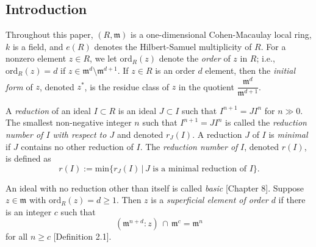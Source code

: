 \documentclass{amsart}
\theoremstyle{definition}
\theoremstyle{definition}
\numberwithin{equation}{section}
\theoremstyle{definition}
\begin{document}
\large{
\begin{center}
\section{Introduction}
\end{center}

Throughout this paper, $(R,\mathfrak{m})$ is a one-dimensional Cohen-Macaulay local ring, $k$ is a field, and $e(R)$ denotes the Hilbert-Samuel multiplicity of $R$. For a nonzero element $z \in R$, we let $\text{ord}_{R}(z)$ denote the {\it{order}} of $z$ in $R$; i.e., $\text{ord}_{R}(z)=d$ if $z \in \mathfrak{m}^d \setminus \mathfrak{m}^{d+1}$. If $z \in R$ is an order $d$ element, then the {\it{initial form}} of $z$, denoted $z^*$, is the residue class of $z$ in the quotient $\dfrac{\mathfrak{m}^d}{\mathfrak{m}^{d+1}}$. 
\\\text{}

A {\it{reduction}} of an ideal $I \subset R$ is an ideal $J \subset I$ such that $I^{n+1}=JI^n$ for $n \gg 0$. The smallest non-negative integer $n$ such that $I^{n+1}=JI^n$ is called the {\it{reduction number of $I$ with respect to $J$}} and denoted $r_{J}(I)$. A reduction $J$ of $I$ is {\it{minimal}} if $J$ contains no other reduction of $I$. The {\it{reduction number of}} $I$, denoted $r(I)$, is defined as \\
\begin{equation*}
r(I):=\text{min}\{r_{J}(I)\,|\,J \,\, \text{is a minimal reduction of} \,\, I\}.
\end{equation*}
\text{}

An ideal with no reduction other than itself is called {\it{basic}} \cite{HS06}[Chapter 8]. Suppose $z \in \mathfrak{m}$ with $\text{ord}_{R}(z)=d \geq 1$. Then $z$ is a {\it{superficial element of order $d$}} if there is an integer $c$ such that \\
\begin{equation*}
(\mathfrak{m}^{n+d}:z) \,\cap \, \mathfrak{m}^c=\mathfrak{m}^n
\end{equation*} for all $n \geq c$ \cite{De Stefani16}[Definition 2.1].\\ \text{}

}
\end{document}
